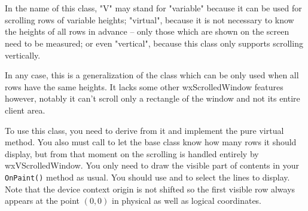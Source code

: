 
\section{}\label{wxvscrolledwindow}

In the name of this class, "V" may stand for "variable" because it can be
used for scrolling rows of variable heights; "virtual", because it is not
necessary to know the heights of all rows in advance -- only those which
are shown on the screen need to be measured; or even "vertical", because
this class only supports scrolling vertically.

In any case, this is a generalization of the
 class which can be only used when
all rows have the same heights. It lacks some other wxScrolledWindow features
however, notably it can't scroll only a rectangle of the window and not its
entire client area.

To use this class, you need to derive from it and implement the
 pure virtual
method. You also must call 
to let the base class know how many rows it should display, but from that
moment on the scrolling is handled entirely by wxVScrolledWindow. You only
need to draw the visible part of contents in your {\tt OnPaint()} method as
usual. You should use 
and  to
select the lines to display. Note that the device context origin is not shifted
so the first visible row always appears at the point $(0, 0)$ in physical as
well as logical coordinates.


\\
\\
\\

